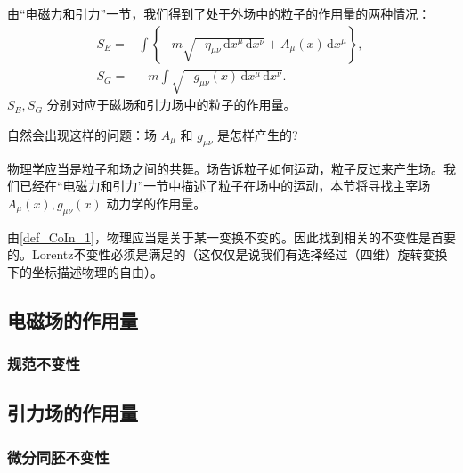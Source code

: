 

由“电磁力和引力”一节，我们得到了处于外场中的粒子的作用量的两种情况：
\begin{equation}
\begin{aligned}
S_E=&\int \left\{-m\sqrt{-\eta_{\mu\nu} \,\mathrm{d}{x} ^\mu \,\mathrm{d}{x} ^\nu}+A_\mu(x) \,\mathrm{d}{x} ^\mu \right\} ,\\
S_G=&-m\int\sqrt{-g_{\mu\nu}(x) \,\mathrm{d}{x} ^\mu \,\mathrm{d}{x} ^\nu}.
\end{aligned}~
\end{equation}
 $S_E,S_G$ 分别对应于磁场和引力场中的粒子的作用量。

自然会出现这样的问题：场 $A_\mu$ 和 $g_{\mu\nu}$ 是怎样产生的?

物理学应当是粒子和场之间的共舞。场告诉粒子如何运动，粒子反过来产生场。我们已经在“电磁力和引力”一节中描述了粒子在场中的运动，本节将寻找主宰场 $A_\mu(x),g_{\mu\nu}(x)$ 动力学的作用量。

由\autoref{def_CoIn_1}，物理应当是关于某一变换不变的。因此找到相关的不变性是首要的。Lorentz不变性必须是满足的（这仅仅是说我们有选择经过（四维）旋转变换下的坐标描述物理的自由）。



\subsection{电磁场的作用量}
\subsubsection{规范不变性}












\subsection{引力场的作用量}


\subsubsection{微分同胚不变性}

























